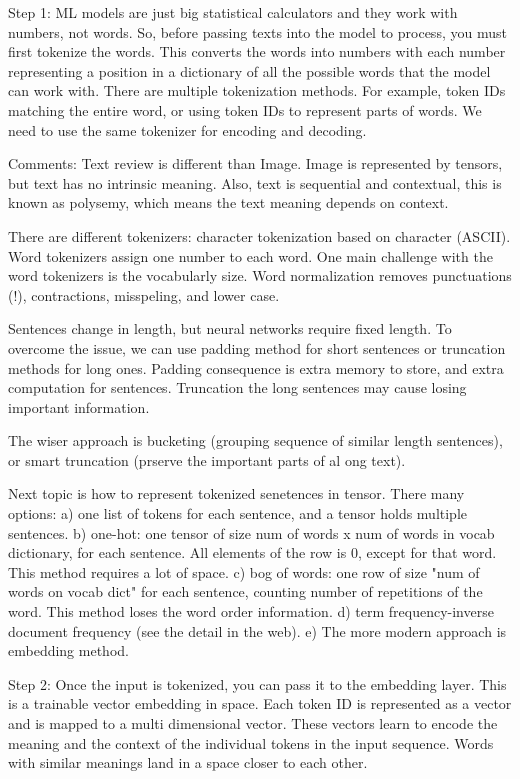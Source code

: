 \documentclass[12pt]{report}
\begin{document}
Step 1:
ML models are just big statistical calculators and they work with numbers, not words. So, before passing texts into the model to process, you must first tokenize the words. This converts the words into numbers with each number representing a position in a dictionary of all the possible words that the model can work with. There are multiple tokenization methods. For example, token IDs matching the entire word, or using token IDs to represent parts of words. We need to use the same tokenizer for encoding and decoding.

Comments: Text review is different than Image. Image is represented by tensors, but text has no intrinsic meaning. Also, text is sequential and contextual, this is known as polysemy, which means the text meaning depends on context. 

There are different tokenizers: character tokenization based on character (ASCII). Word tokenizers assign one number to each word. One main challenge with the word tokenizers is the vocabularly size. Word normalization removes punctuations (!), contractions, misspeling, and lower case. 


Sentences change in length, but neural networks require fixed length. To overcome the issue, we can use padding method for short sentences or truncation methods for long ones. Padding consequence is extra memory to store, and extra computation for sentences. Truncation the long sentences may cause losing important information. 

The wiser approach is bucketing (grouping sequence of similar length sentences), or smart truncation (prserve the important parts of al ong text).

Next topic is how to represent tokenized senetences in tensor. There many options: a) one list of tokens for each sentence, and a tensor holds multiple sentences. b) one-hot: one tensor of size num of words x num of words in vocab dictionary, for each sentence. All elements of the row is 0, except for that word. This method requires a lot of space. c) bog of words: one row of size "num of words on vocab dict" for each sentence, counting number of repetitions of the word. This method loses the word order information. d) term frequency-inverse document frequency (see the detail in the web). e) The more modern approach is embedding method.


Step 2:
Once the input is tokenized, you can pass it to the embedding layer. This is a trainable vector embedding in space. Each token ID is represented as a vector and is mapped to a multi dimensional vector. These vectors learn to encode the meaning and the context of the individual tokens in the input sequence. Words with similar meanings land in a space closer to each other.
\end{document}
